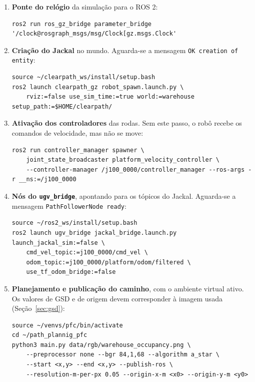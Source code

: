 \documentclass[
    12pt,
    openright,
    oneside,
    a4paper,
    english,
    brazil
]{abntex2}
\begin{document}
\begin{apendicesenv}
\begin{enumerate}
    \item \textbf{Ponte do relógio} da simulação para o ROS 2:
\begin{lstlisting}[style=comandos]
ros2 run ros_gz_bridge parameter_bridge '/clock@rosgraph_msgs/msg/Clock[gz.msgs.Clock'
\end{lstlisting}

    \item \textbf{Criação do Jackal} no mundo. Aguarda-se a mensagem \texttt{OK creation of entity}:
\begin{lstlisting}[style=comandos]
source ~/clearpath_ws/install/setup.bash
ros2 launch clearpath_gz robot_spawn.launch.py \
    rviz:=false use_sim_time:=true world:=warehouse setup_path:=$HOME/clearpath/
\end{lstlisting}

    \item \textbf{Ativação dos controladores} das rodas. Sem este passo, o robô recebe os comandos de velocidade, mas não se move:
\begin{lstlisting}[style=comandos]
ros2 run controller_manager spawner \
    joint_state_broadcaster platform_velocity_controller \
    --controller-manager /j100_0000/controller_manager --ros-args -r __ns:=/j100_0000
\end{lstlisting}

    \item \textbf{Nós do \texttt{ugv\_bridge}}, apontando para os tópicos do Jackal. Aguarda-se a mensagem \texttt{PathFollowerNode ready}:
\begin{lstlisting}[style=comandos]
source ~/ros2_ws/install/setup.bash
ros2 launch ugv_bridge jackal_bridge.launch.py launch_jackal_sim:=false \
    cmd_vel_topic:=j100_0000/cmd_vel \
    odom_topic:=j100_0000/platform/odom/filtered \
    use_tf_odom_bridge:=false
\end{lstlisting}

    \item \textbf{Planejamento e publicação do caminho}, com o ambiente virtual ativo. Os valores de GSD e de origem devem corresponder à imagem usada (Seção~\ref{sec:gsd}):
\begin{lstlisting}[style=comandos]
source ~/venvs/pfc/bin/activate
cd ~/path_plannig_pfc
python3 main.py data/rgb/warehouse_occupancy.png \
    --preprocessor none --bgr 84,1,68 --algorithm a_star \
    --start <x,y> --end <x,y> --publish-ros \
    --resolution-m-per-px 0.05 --origin-x-m <x0> --origin-y-m <y0>
\end{lstlisting}
\end{enumerate}


\end{apendicesenv}
\end{document}
